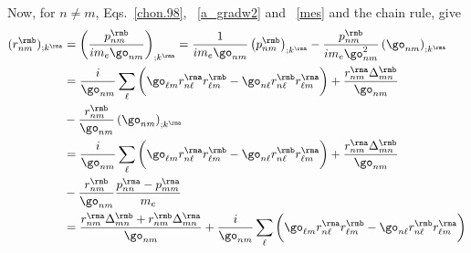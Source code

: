 Now, for $n \ne m$, Eqs.~\eqref{chon.98},
~\eqref{a_gradw2} and 
~\eqref{mes} and the chain rule, give
\begin{align}\label{a_rgendevn}
(r^{\rmb}_{nm})_{;k^{\rma}}&=\left(\frac{p^{\rmb}_{nm}}{im_e\go_{nm}}\right)_{;k^{\rma}}
=
\frac{1}
{im_e\go_{nm}}
\left(
p^{\rmb}_{nm}
\right)_{;k^{\rma}}
-
\frac{p^{\rmb}_{nm}}
{im_e\go^2_{nm}}
\left(
\go_{nm}
\right)_{;k^{\rma}}
\nonumber \\
&=
\frac{i}{\go_{nm}}
\sum_{\ell}
\bigg(
\go_{\ell m}
r^{\rma}_{n\ell}
r^{\rmb}_{\ell m}
-
\go_{n\ell}
r^{\rmb}_{n\ell}
r^{\rma}_{\ell m}
\bigg)
+
\frac{r^{\rma}_{nm}
\Delta^{\rmb}_{mn}}
{\go_{nm}}
\nonumber \\
&
-
\frac{r^{\rmb}_{nm}}
{\go_{nm}}
\left(
\go_{nm}
\right)_{;k^{\rma}}
\nonumber \\
&=
\frac{i}{\go_{nm}}
\sum_{\ell}
\bigg(
\go_{\ell m}
r^{\rma}_{n\ell}
r^{\rmb}_{\ell m}
-
\go_{n\ell}
r^{\rmb}_{n\ell}
r^{\rma}_{\ell m}
\bigg)
+
\frac{r^{\rma}_{nm}
\Delta^{\rmb}_{mn}}
{\go_{nm}}
\nonumber \\
&
-
\frac{r^{\rmb}_{nm}}
{\go_{nm}}
\frac{p^{\rma}_{nn}-p^{\rma}_{mm}}{m_e}
\nonumber \\
&=
\frac{
r^{\rma}_{nm}
\Delta^{\rmb}_{mn}
+r^{\rmb}_{nm}
\Delta^{\rma}_{mn}
}
{\go_{nm}}
+
\frac{i}{\go_{nm}}
\sum_{\ell}
\bigg(
\go_{\ell m}
r^{\rma}_{n\ell}
r^{\rmb}_{\ell m}
-
\go_{n\ell}
r^{\rmb}_{n\ell}
r^{\rma}_{\ell m}
\bigg)
\end{align}
